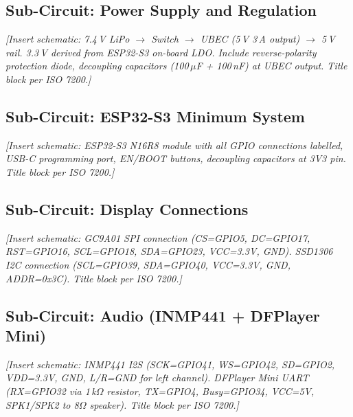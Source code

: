 \documentclass[12pt,a4paper]{article}
\begin{document}
\subsection{Sub-Circuit: Power Supply and Regulation}

\begin{center}
\textit{[Insert schematic: 7.4\,V LiPo $\rightarrow$ Switch
$\rightarrow$ UBEC (5\,V 3\,A output) $\rightarrow$ 5\,V rail.
3.3\,V derived from ESP32-S3 on-board LDO. Include reverse-polarity
protection diode, decoupling capacitors (100\,$\mu$F + 100\,nF)
at UBEC output. Title block per ISO 7200.]}
\end{center}
\label{fig:ckt_power}

\subsection{Sub-Circuit: ESP32-S3 Minimum System}

\begin{center}
\textit{[Insert schematic: ESP32-S3 N16R8 module with all GPIO
connections labelled, USB-C programming port, EN/BOOT buttons,
decoupling capacitors at 3V3 pin. Title block per ISO 7200.]}
\end{center}
\label{fig:ckt_mcu}

\subsection{Sub-Circuit: Display Connections}

\begin{center}
\textit{[Insert schematic: GC9A01 SPI connection (CS=GPIO5, DC=GPIO17,
RST=GPIO16, SCL=GPIO18, SDA=GPIO23, VCC=3.3V, GND). SSD1306 I2C
connection (SCL=GPIO39, SDA=GPIO40, VCC=3.3V, GND, ADDR=0x3C).
Title block per ISO 7200.]}
\end{center}
\label{fig:ckt_display}

\subsection{Sub-Circuit: Audio (INMP441 + DFPlayer Mini)}

\begin{center}
\textit{[Insert schematic: INMP441 I2S (SCK=GPIO41, WS=GPIO42,
SD=GPIO2, VDD=3.3V, GND, L/R=GND for left channel). DFPlayer Mini
UART (RX=GPIO32 via 1\,k$\Omega$ resistor, TX=GPIO4, Busy=GPIO34,
VCC=5V, SPK1/SPK2 to 8$\Omega$ speaker). Title block per ISO 7200.]}
\end{center}
\label{fig:ckt_audio}
\end{document}
